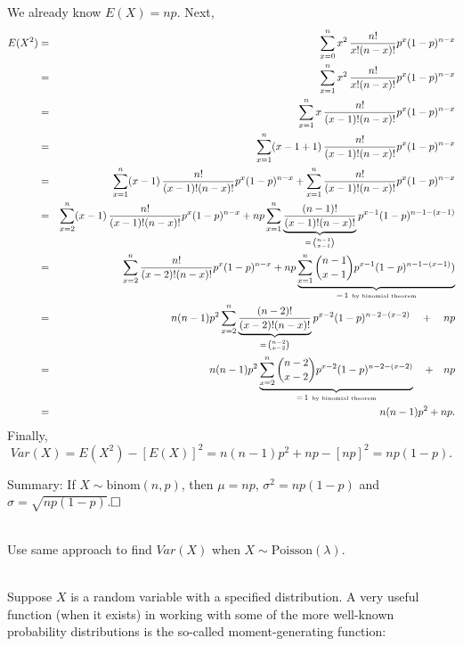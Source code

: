 \documentclass[12pt]{article}
\begin{document}
We already know $E(X) = np$.  Next,
\begin{eqnarray*}
E(X^2)
&=&
\sum_{x=0}^n x^2\,\frac {n!}{x!(n-x)!}p^x(1-p)^{n-x}\\
&=&
\sum_{x=1}^n x^2\,\frac {n!}{x!(n-x)!}p^x(1-p)^{n-x}\\
&=&
\sum_{x=1}^n x\,\frac {n!}{(x-1)!(n-x)!}p^x(1-p)^{n-x}\\
&=&
\sum_{x=1}^n (x-1+1)\,\frac {n!}{(x-1)!(n-x)!}p^x(1-p)^{n-x}\\
&=&
\sum_{x=1}^n (x-1)\,\frac {n!}{(x-1)!(n-x)!}p^x(1-p)^{n-x} + \sum_{x=1}^n \frac {n!}{(x-1)!(n-x)!}p^x(1-p)^{n-x}\\
&=&
\sum_{x=2}^n (x-1)\,\frac {n!}{(x-1)!(n-x)!}p^x(1-p)^{n-x} + np\sum_{x=1}^n \underbrace{\frac {(n-1)!}{(x-1)!(n-x)!}}_{=\,{n-1\choose x-1}}p^{x-1}(1-p)^{n-1-(x-1)}\\
&=&
\sum_{x=2}^n \frac {n!}{(x-2)!(n-x)!}p^x(1-p)^{n-x} + np\underbrace{\sum_{x=1}^n {n-1\choose x-1}p^{x-1}(1-p)^{n-1-(x-1)})}_{=\,1\mbox{ \tiny by binomial theorem}}\\
&=&
n(n-1)p^2\sum_{x=2}^n \underbrace{\frac {(n-2)!}{(x-2)!(n-x)!}}_{=\,{n-2\choose x-2}}p^{x-2}(1-p)^{n-2-(x-2)} \quad + \quad np\\
&=&
n(n-1)p^2\underbrace{\sum_{x=2}^n {n-2\choose x-2}p^{x-2}(1-p)^{n-2-(x-2)}}_{=\,1\mbox{ \tiny by binomial theorem}}\quad +\quad np\\
&=& n(n-1)p^2 + np.
\end{eqnarray*}
Finally,
$$Var(X) = E(X^2) - \left[E(X)\right]^2 = n(n-1)p^2 + np - \left[np\right]^2 = np(1-p).$$

\noindent Summary: If $X\sim \mbox{binom}(n,p)$, then $\mu=np$, $\sigma^2 = np(1-p)$ and $\sigma = \sqrt{np(1-p)}$.$\hfill \Box$


\bigskip
\bigskip
\bigskip

\\
Use same approach to find $Var(X)$ when $X\sim \mbox{Poisson}(\lambda)$.\\



\newpage





\label{mgf-part1}\\

\noindent Suppose $X$ is a random variable with a specified distribution.
A very useful function (when it exists) in working with some of the more well-known probability distributions is the so-called
moment-generating function\label{d:mgf}:
\end{document}
